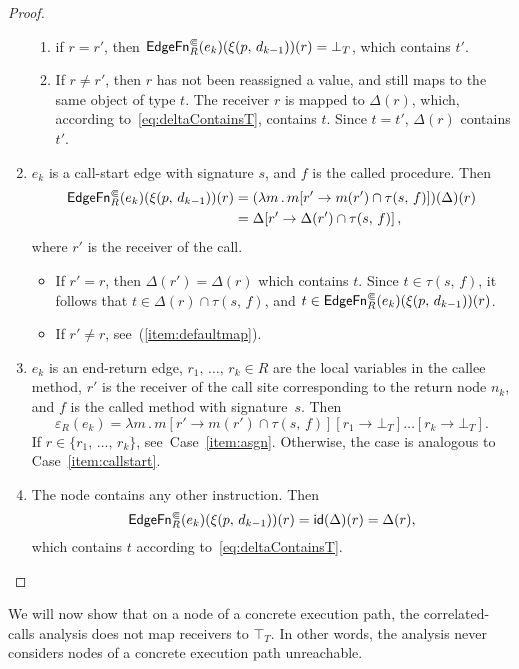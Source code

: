\begin{proof}
\begin{enumerate}
      \begin{enumerate}
        \item if $r=r'$, then $\textsf{EdgeFn}^\Subset_{R}(e_k)(\xi(p,\,d_{k-1}))(r)=\bot_T$, which contains $t'$.
        \item\label{item:defaultmap} If $r\ne r'$, then $r$ has not been reassigned a value, and still maps to the same object of type $t$. The receiver $r$ is mapped to $\Delta(r)$, which, according to~\eqref{eq:deltaContainsT}, contains $t$. Since $t=t'$, $\Delta(r)$ contains $t'$.
      \end{enumerate}
    \item\label{item:callstart} $e_k$ is a call-start edge with signature $s$, and $f$ is the called procedure.
      Then
        \begin{align*}
          \textsf{EdgeFn}^\Subset_{R}(e_k)(\xi(p,\,d_{k-1}))(r)
          &=(\lambda m\,.\,m[r'\to m(r')\cap\tau(s,\,f)])(\Delta)(r)\\
          &=\Delta[r'\to\Delta(r')\cap\tau(s,\,f)]\,,
        \end{align*}
      where $r'$ is the receiver of the call.
      \begin{itemize}
        \item If $r'=r$, then $\Delta(r')=\Delta(r)$ which contains $t$. Since $t\in\tau(s,\,f)$, it follows that $t\in\Delta(r)\cap\tau(s,\,f)$, and $t\in\textsf{EdgeFn}^\Subset_{R}(e_k)(\xi(p,\,d_{k-1}))(r)$.
         \item If $r'\ne r$, see~(\ref{item:defaultmap}).
       \end{itemize}
    \item $e_k$ is an end-return edge, $r_1,\,\dots,\,r_k\in R$ are the local variables in the callee method, $r'$ is the receiver of the call site corresponding to the return node $n_k$, and $f$ is the called method with signature~$s$.
      Then 
      \[
        \varepsilon_R(e_k)=\lambda m\,.\,m[r'\to m(r')\cap\tau(s,\,f)][r_1\to\bot_T]\dots[r_k\to\bot_T].
      \]
      If $r\in\{r_1,\,\dots,\,r_k\}$, see~Case~\ref{item:asgn}. Otherwise, the case is analogous to Case~\ref{item:callstart}.
    \item\label{item:idcase} The node contains any other instruction.
      Then 
      \[
        \textsf{EdgeFn}^\Subset_{R}(e_k)(\xi(p,\,d_{k-1}))(r)=\textsf{id}(\Delta)(r)=\Delta(r),
      \]
      which contains $t$ according to~\eqref{eq:deltaContainsT}.\qedhere
  \end{enumerate}
\end{proof}

We will now show that on a node of a concrete execution path, the correlated-calls analysis does not map receivers to $\top_T$. In other words, the analysis never considers nodes of a concrete execution path unreachable.

